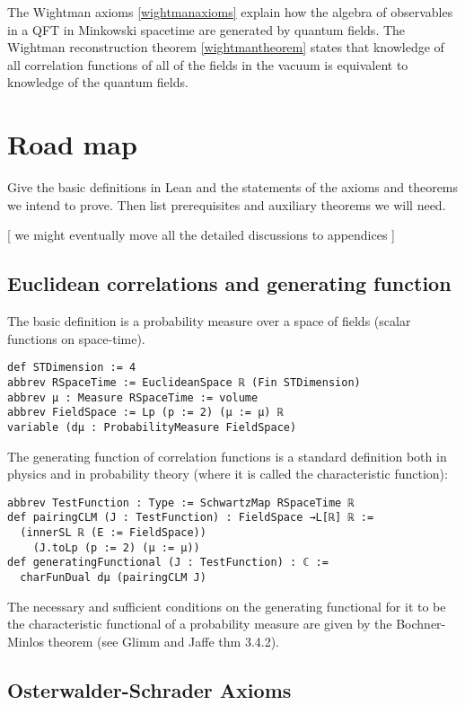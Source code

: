 \documentclass{article}
\begin{document}
The Wightman axioms \ref{wightmanaxioms} explain how the algebra of observables in a QFT in Minkowski spacetime are generated by quantum fields. The Wightman reconstruction theorem \ref{wightmantheorem} states that knowledge of all correlation functions of all of the fields in the vacuum is equivalent to knowledge of the quantum fields. 
\fi




\section{Road map}

Give the basic definitions in Lean and the statements of the axioms and theorems we intend to prove.
Then list prerequisites and auxiliary theorems we will need.

[ we might eventually move all the detailed discussions to appendices ]

\subsection{Euclidean correlations and generating function}

The basic definition is a probability measure over a space of fields (scalar functions
on space-time).
\begin{lstlisting}
def STDimension := 4
abbrev RSpaceTime := EuclideanSpace ℝ (Fin STDimension)
abbrev μ : Measure RSpaceTime := volume
abbrev FieldSpace := Lp (p := 2) (μ := μ) ℝ
variable (dμ : ProbabilityMeasure FieldSpace)
\end{lstlisting}

The generating function of correlation functions is a standard definition both in physics
and in probability theory (where it is called the characteristic function):
\begin{lstlisting}
abbrev TestFunction : Type := SchwartzMap RSpaceTime ℝ
def pairingCLM (J : TestFunction) : FieldSpace →L[ℝ] ℝ :=
  (innerSL ℝ (E := FieldSpace))
    (J.toLp (p := 2) (μ := μ))
def generatingFunctional (J : TestFunction) : ℂ :=
  charFunDual dμ (pairingCLM J)
\end{lstlisting}

The necessary and sufficient conditions on the generating functional for it to be
the characteristic functional of a probability measure  are given by the Bochner-Minlos theorem
(see Glimm and Jaffe thm 3.4.2).

\subsection{Osterwalder-Schrader Axioms} \label{OSaxioms}
\end{document}
